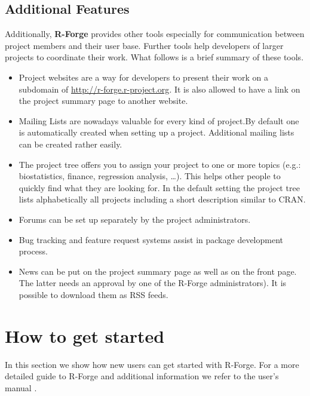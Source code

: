 \subsection{Additional Features}

Additionally, \textbf{R-Forge} provides other tools especially for
communication between project members and their user base. Further
tools help developers of larger projects to coordinate their work.
What follows is a brief summary of these tools.
\begin{itemize}
\item Project websites are a way for developers to present their work on a
subdomain of \url{http://r-forge.r-project.org}. It is also allowed to
have a link on the project summary page to another website. 
\item Mailing Lists are nowadays valuable for every kind of project.By default one is automatically created when setting up a project. Additional mailing lists can be
  created rather easily. 
\item The project tree offers you to assign your project to one or more
  topics (e.g.: biostatistics, finance, regression analysis,
  \ldots). This helps other people to quickly find what they are
  looking for. In the default setting the project tree lists
  alphabetically all
  projects including a short description similar to CRAN.
\item Forums can be set up separately by the project
  administrators.%
\item Bug tracking and feature request systems assist in package
  development process.
\item News can be put on the project summary page as well as on the
  front page. The latter needs an approval by one of the R-Forge
  administrators). It is possible to download them as RSS feeds.
\end{itemize}

\section{How to get started}
In this section we show how new users can get started with
R-Forge. For a more detailed guide to R-Forge and additional
information we refer to the user's manual
\cite{forge:theussl:2008}.

